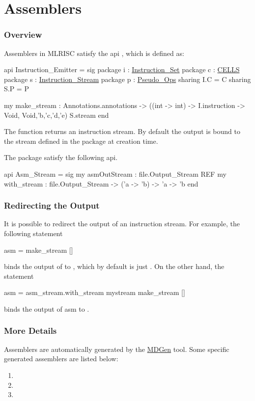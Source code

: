 \section{Assemblers}

\subsubsection{Overview}
Assemblers in MLRISC satisfy the api 
,
which is defined as:
\begin{SML}
api Instruction_Emitter =
sig
   package i : \href{instructions.html}{Instruction_Set}
   package c : \href{cells.html}{CELLS}
   package s : \href{streams.html}{Instruction_Stream}
   package p : \href{pseudo-ops.html}{Pseudo_Ops}
      sharing I.C = C
      sharing S.P = P

   my make_stream : Annotations.annotations ->
                     ((int -> int) -> I.instruction -> Void,
                      Void,'b,'c,'d,'e) S.stream
end
\end{SML}

The function  returns an instruction stream.
By default the output is bound to the stream  
defined in the package 
 at creation time.

The package  satisfy the following api.
\begin{SML}
api Asm_Stream = sig
  my asmOutStream : file.Output_Stream REF
  my with_stream : file.Output_Stream -> ('a -> 'b) -> 'a -> 'b
end
\end{SML}
\subsubsection{Redirecting the Output}
It is possible to redirect the output of an instruction stream.
For example, the following statement
\begin{SML}
   asm = make_stream []
\end{SML}
binds the output of  to , which
by default is just .  On the other hand, the
statement
\begin{SML}
   asm = asm_stream.with_stream mystream make_stream []
\end{SML}
binds the output of asm to .

\subsubsection{More Details}

Assemblers are automatically generated by the 
\href{mlrisc-md.html}{MDGen} tool.  Some specific generated
assemblers are listed below:
\begin{enumerate}
 \item {}
 \item {}
 \item {}
\end{enumerate}
